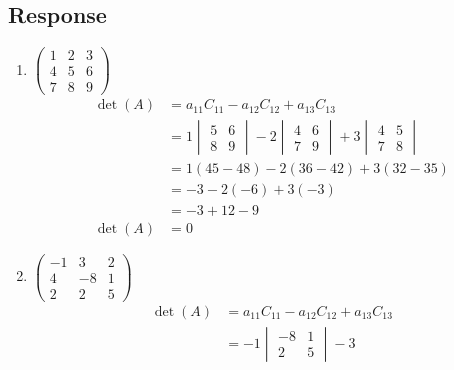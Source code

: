 \documentclass[13pt]{article}
\begin{document}
    \subsection*{Response}
    \begin{enumerate}[label=(\alph*),leftmargin=*]
    \item $
      \begin{pmatrix}
        1 & 2 & 3 \\
        4 & 5 & 6 \\
        7 & 8 & 9
      \end{pmatrix}
      $
      \begin{align*}
        \det(A) &= a_{11}C_{11} - a_{12}C_{12} + a_{13}C_{13} \\
                &= 1
                  \begin{vmatrix}
                    5 & 6 \\
                    8 & 9
                  \end{vmatrix} - 2
                  \begin{vmatrix}
                    4 & 6 \\
                    7 & 9
                  \end{vmatrix} + 3
                  \begin{vmatrix}
                    4 & 5 \\
                    7 & 8
                  \end{vmatrix} \\
                &= 1(45 - 48) - 2(36 - 42)  + 3(32 - 35) \\
                &= -3 - 2(-6) + 3(-3) \\
                &= -3 + 12 - 9 \\
        \det(A) &= 0
      \end{align*}
    \item $
      \begin{pmatrix}
        -1 & 3 & 2 \\
        4 & -8 & 1 \\
        2 & 2 & 5
      \end{pmatrix}
      $
      \begin{align*}
        \det(A) &= a_{11}C_{11} - a_{12}C_{12} + a_{13}C_{13} \\
                &= -1
                  \begin{vmatrix}
                    -8 & 1 \\
                    2 & 5
                  \end{vmatrix} - 3

\end{align*}
\end{enumerate}
\end{document}
